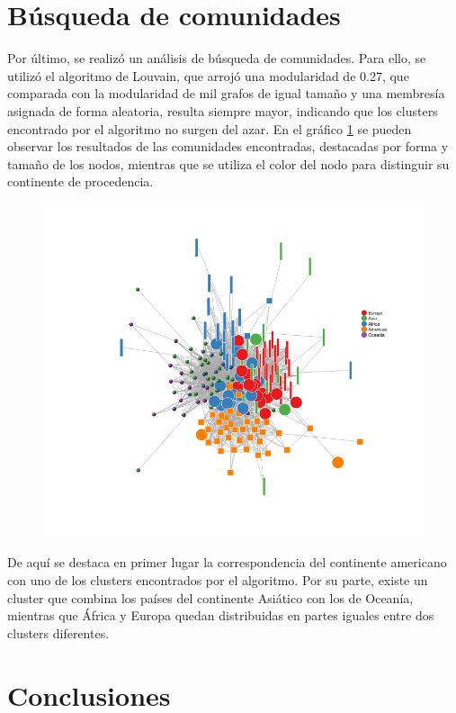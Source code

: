 \documentclass[runningheads,a4paper]{llncs}
\begin{document}
\section{Búsqueda de comunidades}

Por último, se realizó un análisis de búsqueda de comunidades. Para ello, se utilizó el algoritmo de Louvain, que arrojó una modularidad de 0.27, que comparada con la modularidad de mil grafos de igual tamaño y una membresía asignada de forma aleatoria, resulta siempre mayor, indicando que los clusters encontrado por el algoritmo no surgen del azar.
En el gráfico \ref{fig:comunidades} se pueden observar los resultados de las comunidades encontradas, destacadas por forma y tamaño de los nodos, mientras que se utiliza el color del nodo para distinguir su continente de procedencia. 

\begin{figure}[h]
    \centering
    \includegraphics[scale=.5]{grafo_2011_comunidades}
    \caption{}
    \label{fig:comunidades}
\end{figure}


De aquí se destaca en primer lugar la correspondencia del continente americano con uno de los clusters encontrados por el algoritmo. Por su parte, existe un cluster que combina los países del continente Asiático con los de Oceanía, mientras que África y Europa quedan distribuidas en partes iguales entre dos clusters diferentes. 

\section{Conclusiones}
\end{document}
